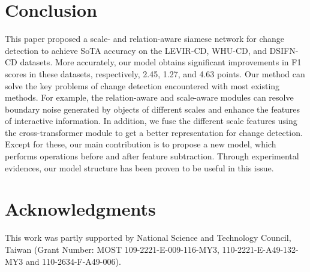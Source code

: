 \documentclass[letterpaper]{article} \usepackage{aaai23}  \usepackage{times}  \usepackage{helvet}  \usepackage{courier}  \usepackage[hyphens]{url}  \usepackage{graphicx} \urlstyle{rm} \def\UrlFont{\rm}  \usepackage{natbib}  \usepackage{caption} \frenchspacing  \setlength{\pdfpagewidth}{8.5in}  \setlength{\pdfpageheight}{11in}  \usepackage{algorithm}
\begin{document}
\vspace{0.1cm}
\section{Conclusion} 



This paper proposed a scale- and relation-aware siamese network for change detection to achieve SoTA accuracy on the LEVIR-CD, WHU-CD, and DSIFN-CD datasets. More accurately, our model obtains significant improvements in F1 scores in these datasets, respectively, 2.45, 1.27, and 4.63 points. Our method can solve the key problems of change detection encountered with most existing methods. For example, the relation-aware and scale-aware modules can resolve boundary noise generated by objects of different scales and enhance the features of interactive information.  In addition, we fuse the different scale features using the cross-transformer module to get a better representation for change detection. Except for these, our main contribution is to propose a new model, which performs operations before and after feature subtraction. Through experimental evidences, our model structure has been proven to be useful in this issue.               
\vspace{0.1cm}





\section{Acknowledgments}
This work was partly supported by National Science and Technology Council, Taiwan (Grant Number: MOST 109-2221-E-009-116-MY3, 110-2221-E-A49-132-MY3 and 110-2634-F-A49-006).



\end{document}

